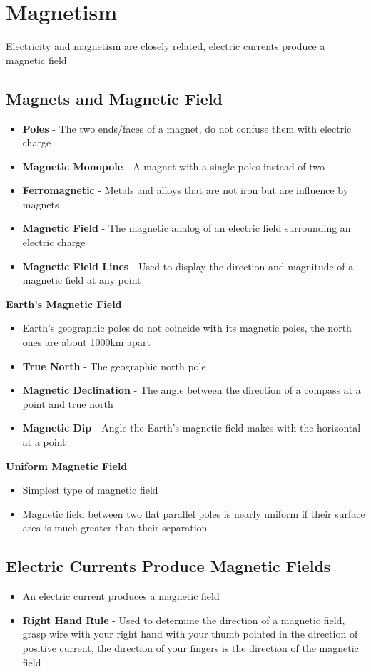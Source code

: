 \section{Magnetism}
Electricity and magnetism are closely related, electric currents produce a magnetic field

\subsection{Magnets and Magnetic Field}
\begin{itemize}
    \item \textbf{Poles} - The two ends/faces of a magnet, do not confuse them with electric charge
    \item \textbf{Magnetic Monopole} - A magnet with a single poles instead of two
    \item \textbf{Ferromagnetic} - Metals and alloys that are not iron but are influence by magnets
    \item\textbf{Magnetic Field} - The magnetic analog of an electric field surrounding an electric charge
    \item \textbf{Magnetic Field Lines} - Used to display the direction and magnitude of a magnetic field at any point
\end{itemize}

\textbf{Earth's Magnetic Field}
\begin{itemize}
    \item Earth's geographic poles do not coincide with its magnetic poles, the north ones are about 1000km apart
    \item \textbf{True North} - The geographic north pole
    \item \textbf{Magnetic Declination} - The angle between the direction of a compass at a point and true north
    \item \textbf{Magnetic Dip} - Angle the Earth's magnetic field makes with the horizontal at a point
\end{itemize}

\textbf{Uniform Magnetic Field} 
\begin{itemize}
    \item Simplest type of magnetic field
    \item Magnetic field between two flat parallel poles is nearly uniform if their surface area is much greater than their separation
\end{itemize}

\subsection{Electric Currents Produce Magnetic Fields}
\begin{itemize}
    \item An electric current produces a magnetic field
    \item \textbf{Right Hand Rule} - Used to determine the direction of a magnetic field, grasp wire with your right hand with your thumb pointed in the direction of positive current, the direction of your fingers is the direction of the magnetic field
\end{itemize}

